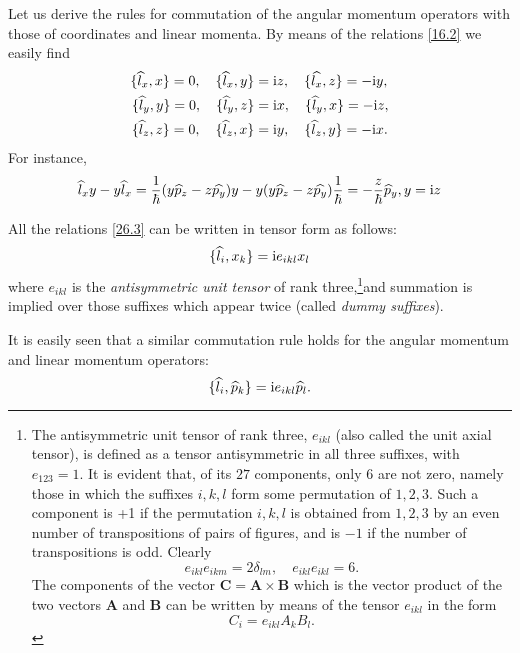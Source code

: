 Let us derive the rules for commutation of the angular momentum operators with those of coordinates and linear momenta. By means of the relations \eqref{16.2} we easily find
\begin{equation}\label{26.3}
\begin{split}
\{\widehat{l}_x,x\}=0,\quad\{\widehat{l}_x,y \}&=\mathrm{i} z,\quad\{\widehat{l_x},z  \}=-\mathrm{i} y,\\
\{\widehat{l}_y,y \}=0,\quad\{\widehat{l}_y,z \}&=\mathrm{i} x,\quad\{\widehat{l}_y,x  \}=-\mathrm{i} z,\\
\{\widehat{l}_z,z \}=0,\quad\{\widehat{l}_z,x \}&=\mathrm{i} y,\quad\{\widehat{l}_z,y \}=-\mathrm{i} x.
\end{split}
\end{equation}
For instance,
\[ \widehat{l}_xy-y\widehat{l}_x=\frac{1}{\hbar}(y\widehat{p}_z-z\widehat{p_y})y-y(y\widehat{p}_z-z\widehat{p_y})\frac{1}{\hbar}=-\frac{z}{\hbar}{\widehat{p}_y,y}=\mathrm{i} z \]




All the relations \eqref{26.3} can be written in tensor form as follows:
\begin{equation}\label{26.4}
\{\widehat{l}_i,x_k\}=\mathrm{i} e_{ikl}x_l
\end{equation}
where $ e_{ikl} $ is the \textit{antisymmetric unit tensor} of rank three,\footnote{The antisymmetric unit tensor of rank three, $ e_{ikl} $ (also called the unit axial tensor), is defined as a tensor antisymmetric in all three suffixes, with $ e_{123} =1  $. It is evident that, of its $ 27 $ components, only $ 6 $ are not zero, namely those in which the suffixes $ i, k, l $ form some permutation of $ 1, 2, 3 $. Such a component is +1 if the permutation $ i, k, l $ is obtained from $ 1, 2, 3 $ by an even number of transpositions of pairs of figures, and is $ -1 $ if the number of transpositions is odd. Clearly 
\[ e_{ikl}e_{ikm} = 2\delta_{lm}, \quad e_{ikl}e_{ikl}= 6. \]	
The components of the vector $ \bm{C} = \bm{A} \times \bm{B} $ which is the vector product of the two vectors $ \bm{A} $ and $ \bm{B} $ can be written by means of the tensor $ e_{ikl} $ in the form
\[ C_i=e_{ikl}A_kB_l. \]
}and summation is implied over those suffixes which appear twice (called \textit{dummy suffixes}).

It is easily seen that a similar commutation rule holds for the angular momentum and linear momentum operators:
\begin{equation}\label{26.5}
\{\widehat{l}_i,\widehat{p}_k \}=\mathrm{i} e_{ikl}\widehat{p}_l.
\end{equation}



